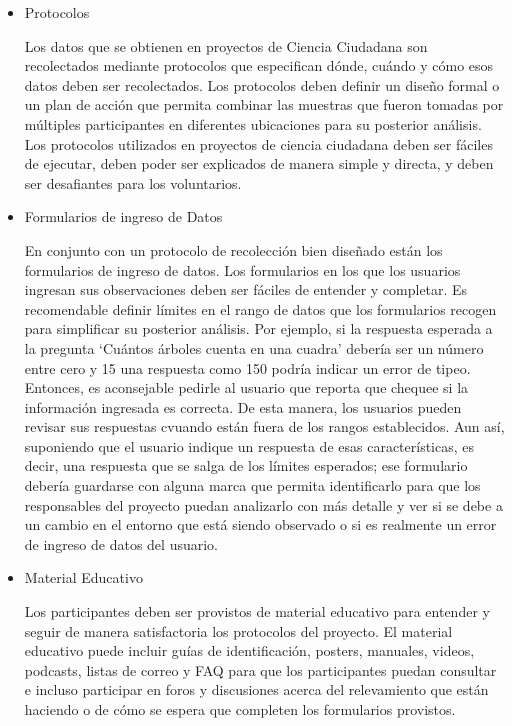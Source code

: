 \begin{itemize}
	\item {Protocolos}	
			
			Los datos que se obtienen en proyectos de Ciencia Ciudadana son recolectados mediante protocolos que especifican dónde, cuándo y cómo esos datos deben ser recolectados. Los protocolos deben definir un diseño formal o un plan de acción que permita combinar las muestras que fueron tomadas por múltiples participantes en diferentes ubicaciones para su posterior análisis. Los protocolos utilizados en proyectos de ciencia ciudadana deben ser fáciles de ejecutar, deben poder ser explicados de manera simple y directa, y deben ser desafiantes para los voluntarios.		
		
	\item {Formularios de ingreso de Datos}	
			
			En conjunto con un protocolo de recolección bien diseñado están los formularios de ingreso de datos. Los formularios en los que los usuarios ingresan sus observaciones deben ser fáciles de entender y completar. 
			Es recomendable definir límites en el rango de datos que los formularios recogen para simplificar su posterior análisis. Por ejemplo, si la respuesta esperada a la pregunta `Cuántos árboles cuenta en una cuadra' debería ser un número entre cero y 15 una respuesta como 150 podría indicar un error de tipeo. Entonces, es aconsejable pedirle al usuario que reporta que chequee si la información ingresada es correcta. De esta manera, los usuarios pueden revisar sus respuestas cvuando están fuera de los rangos establecidos. Aun así, suponiendo que el usuario indique un respuesta de esas características, es decir, una respuesta que se salga de los límites esperados; ese formulario debería guardarse con alguna marca que permita identificarlo para que los responsables del proyecto puedan analizarlo con más detalle y ver si se debe a un cambio en el entorno que está siendo observado o si es realmente un error de ingreso de datos del usuario.
			
	\item {Material Educativo}
		
		Los participantes deben ser provistos de material educativo para entender y seguir de manera satisfactoria los protocolos del proyecto. El material educativo puede incluir guías de identificación, posters, manuales, videos, podcasts, listas de correo y FAQ para que los participantes puedan consultar e incluso participar en foros y discusiones acerca del relevamiento que están haciendo o de cómo se espera que completen los formularios provistos. \cite{bonney2009citizen}
		
		
\end{itemize} 

